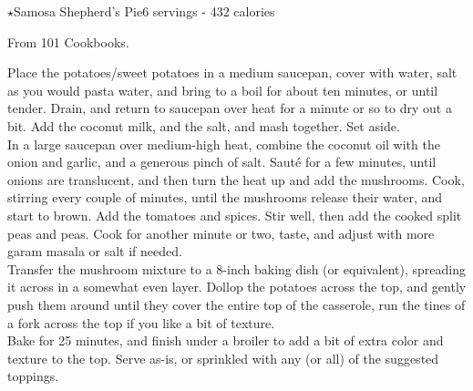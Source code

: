 \begin{recipe}{$\star$Samosa Shepherd's Pie}{6 servings - 432 calories}{}

\freeform From 101 Cookbooks.


Place the potatoes/sweet potatoes in a medium saucepan, cover with water, salt as you would pasta water, and bring to a boil for about ten minutes, or until tender. Drain, and return to saucepan over heat for a minute or so to dry out a bit. Add the coconut milk, and the salt, and mash together. Set aside.\\

In a large saucepan over medium-high heat, combine the coconut oil with the onion and garlic, and a generous pinch of salt. Sauté for a few minutes, until onions are translucent, and then turn the heat up and add the mushrooms. Cook, stirring every couple of minutes, until the mushrooms release their water, and start to brown. Add the tomatoes and spices. Stir well, then add the cooked split peas and peas. Cook for another minute or two, taste, and adjust with more garam masala or salt if needed.\\

Transfer the mushroom mixture to a 8-inch baking dish (or equivalent), spreading it across in a somewhat even layer. Dollop the potatoes across the top, and gently push them around until they cover the entire top of the casserole, run the tines of a fork across the top if you like a bit of texture.\\

Bake for 25 minutes, and finish under a broiler to add a bit of extra color and texture to the top. Serve as-is, or sprinkled with any (or all) of the suggested toppings.

\end{recipe}